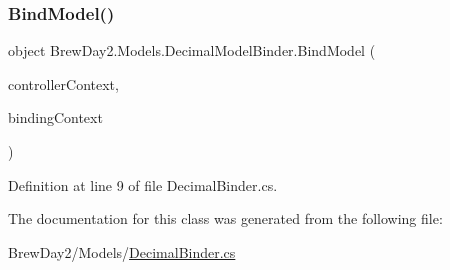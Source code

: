 \subsubsection{\texorpdfstring{Bind\+Model()}{BindModel()}}
{\footnotesize\ttfamily object Brew\+Day2.\+Models.\+Decimal\+Model\+Binder.\+Bind\+Model (\begin{DoxyParamCaption}\item[{Controller\+Context}]{controller\+Context,  }\item[{Model\+Binding\+Context}]{binding\+Context }\end{DoxyParamCaption})}



Definition at line 9 of file Decimal\+Binder.\+cs.



The documentation for this class was generated from the following file\+:\begin{DoxyCompactItemize}
\item 
Brew\+Day2/\+Models/\mbox{\hyperlink{_decimal_binder_8cs}{Decimal\+Binder.\+cs}}\end{DoxyCompactItemize}
